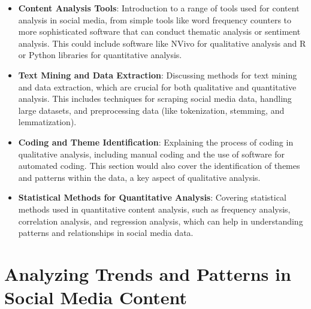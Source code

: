 \documentclass[
]{book}
\providecommand{\tightlist}{%
  \setlength{\itemsep}{0pt}\setlength{\parskip}{0pt}}
\begin{document}
\begin{itemize}
\tightlist
\item
  \textbf{Content Analysis Tools}: Introduction to a range of tools used for content analysis in social media, from simple tools like word frequency counters to more sophisticated software that can conduct thematic analysis or sentiment analysis. This could include software like NVivo for qualitative analysis and R or Python libraries for quantitative analysis.
\item
  \textbf{Text Mining and Data Extraction}: Discussing methods for text mining and data extraction, which are crucial for both qualitative and quantitative analysis. This includes techniques for scraping social media data, handling large datasets, and preprocessing data (like tokenization, stemming, and lemmatization).
\item
  \textbf{Coding and Theme Identification}: Explaining the process of coding in qualitative analysis, including manual coding and the use of software for automated coding. This section would also cover the identification of themes and patterns within the data, a key aspect of qualitative analysis.
\item
  \textbf{Statistical Methods for Quantitative Analysis}: Covering statistical methods used in quantitative content analysis, such as frequency analysis, correlation analysis, and regression analysis, which can help in understanding patterns and relationships in social media data.
\end{itemize}

\hypertarget{analyzing-trends-and-patterns-in-social-media-content}{%
\section*{Analyzing Trends and Patterns in Social Media Content}\label{analyzing-trends-and-patterns-in-social-media-content}}
\end{document}
